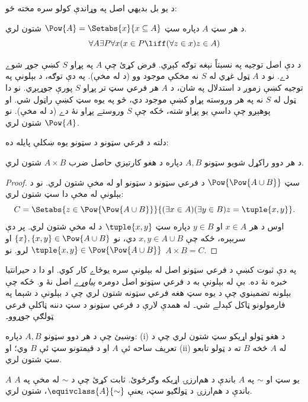 \documentclass[../../../include/open-logic-section]{subfiles}
\begin{document}

د يو بل بديهي اصل په وړاندې کولو سره مخته ځو:

\begin{axiom}
د هر سټ $A$ دپاره سټ $\Pow{A} = \Setabs{x}{x \subseteq A}$ شتون لري.
\[
	\forall A \exists P \forall x(x \in P \liff (\forall z \in x)z \in A)
\]
\end{axiom}

د دې اصل توجيه په نسبتاً نېغه توګه کېږي. فرض کړئ چې $A$ په
پړاو $S$ کښې جوړ شوے دے. نو د $A$ ټول غړي له $S$ نه مخکې
موجود وو (د \stagesacc له مخې). په دې توګه، د بېلونې په توجيه
کښې زموږ د استدلال په شان، د $A$ هر فرعي سټ تر پړاو $S$ پورې
جوړېږي. نو دا ټول له $S$ نه په هر وروسته پړاو کښې موجود دي،
څو په يوه سټ کښې راټول شي. او پوهېږو چې داسې يو پړاو شته،
ځکه چې $S$ وروستے پړاو نۀ دے (د \stagessucc له مخې).
نو $\Pow{A}$ شتون لري.

دلته د فرعي سټونو د سټونو يوه ښکلې پايله ده:

\begin{prop}\label{thm:Products}
د هر دوو راکړل شويو سټونو $A, B$ دپاره د هغو کارتيزي حاصل ضرب $A \times B$ شتون لري.
\end{prop}

\begin{proof}
سټ $\Pow{\Pow{A \cup B}}$ د فرعي سټونو د سټونو او
 له مخې شتون لري.
نو د بېلونې له مخې دا سټ شتون لري:
\[
	C = \Setabs{z \in \Pow{\Pow{A \cup B}}}{(\exists x \in A)(\exists y \in B) z = \tuple{x, y}}.
\]
اوس د هر $x \in A$ او $y \in B$ دپاره سټ $\tuple{x, y}$ د
 له مخې شتون لري.
پر دې سربېره، ځکه چې $x, y
\in A \cup B$ دي، نو $\{x\}, \{x, y\} \in \Pow{A \cup B}$ او
$\tuple{x,y} \in \Pow{\Pow{A \cup B}}$ لرو. نو $A \times B = C$.
\end{proof}

په دې ثبوت کښې د فرعي سټونو اصل له بېلونې سره يوځاے کار کوي.
او دا د حيرانتيا خبره نۀ ده. بې له بېلونې به د فرعي سټونو اصل
دومره \emph{پياوړے} اصل نۀ و. ځکه چې بېلونه تضمينوي چې د يوه سټ هغه فرعي سټونه شتون
لري چې د بېلونې د شېما په فارمولونو ټاکل کېدلے شي۔ له همدې
لارې د فرعي سټونو د سټ دننه ټاکلې فرعي ټولګې جوړوو۔

\begin{prob}
وښيئ چې د هر دوو سټونو $A, B$ دپاره: (i) د هغو ټولو اړيکو سټ
شتون لري چې د تعريف ساحه ئې $A$ او د قيمتونو سټ ئې $B$ وي؛ او
(ii) له $A$ څخه $B$ ته د ټولو تابعو سټ شتون لري.
\end{prob}

\begin{prob}
$A$ يو سټ او $\sim$ په $A$ باندې د هم‌ارزۍ اړيکه وګرځوئ.
ثابت کړئ چې د $\sim$ له مخې په $A$ باندې د هم‌ارزۍ د ټولګيو
سټ، يعنې $\equivclass{A}{\sim}$، شتون لري.
\end{prob}
\end{document}
